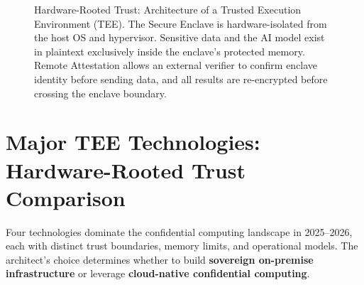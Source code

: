 \begin{figure}[t]
\caption{Hardware-Rooted Trust: Architecture of a Trusted Execution Environment (TEE).
         The Secure Enclave is hardware-isolated from the host OS and hypervisor.
         Sensitive data and the AI model exist in plaintext exclusively inside the
         enclave's protected memory. Remote Attestation allows an external verifier
         to confirm enclave identity before sending data, and all results are
         re-encrypted before crossing the enclave boundary.}
\label{fig:ch9_tee}
\end{figure}

\section{Major TEE Technologies: Hardware-Rooted Trust Comparison}
\label{sec:tee_technologies}

Four technologies dominate the confidential computing landscape in 2025--2026, each with distinct trust boundaries, memory limits, and operational models. The architect's choice determines whether to build \textbf{sovereign on-premise infrastructure} or leverage \textbf{cloud-native confidential computing}.

